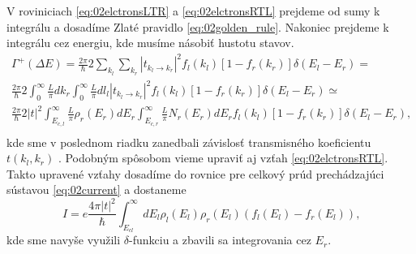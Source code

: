 V roviniciach \eqref{eq:02elctronsLTR} a \eqref{eq:02elctronsRTL}  prejdeme od sumy k integrálu a dosadíme Zlaté pravidlo \eqref{eq:02golden_rule}. Nakoniec prejdeme k integrálu cez energiu, kde musíme násobiť hustotu stavov.
\begin{align*}
\Gamma^+(\Delta E)=\frac{2\pi}{\hbar}2\sum_{k_l} \sum_{k_r} {|t_{k_l \to k_r}|^2f_l(k_l)[1-f_r(k_r)]\delta(E_{l}-E_{r})}= \\
\frac{2\pi}{\hbar}2 \int_{0}^{\infty}\frac{L}{\pi} dk_{r}\int_{0}^{\infty}\frac{L}{\pi} dl_{l} {|t_{k_l \to k_r}|^2f_l(k_l)[1-f_r(k_r)]\delta(E_{l}-E_{r})} \simeq\\
 \frac{2\pi}{\hbar}2 |t|^2 \int_{E_{c,l}}^{\infty}\frac{L}{\pi}\rho_r(E_r)dE_r\int_{E_{c,r}}^{\infty}\frac{L}{\pi} N_r(E_r)dE_r {f_l(k_l)[1-f_r(k_r)]\delta(E_{l}-E_{r})} \text{,}\\
\end{align*}
kde sme v poslednom riadku zanedbali závislosť transmisného koeficientu $t(k_l,k_r)$ . Podobným spôsobom vieme upraviť aj vzťah \eqref{eq:02elctronsRTL}.
Takto upravené vzťahy dosadíme do rovnice pre celkový prúd prechádzajúci sústavou \eqref{eq:02current} a dostaneme 
\begin{equation}
\label{eq:02current2}
I=e\frac{4\pi|t|^2}{\hbar}\int_{E_{cl}}^\infty dE_l\rho_l(E_l)\rho_r(E_l)(f_l(E_l)-f_r(E_l)) \text{,}
\end{equation}
kde sme navyše využili $\delta$-funkciu a zbavili sa integrovania cez $E_r$. 


